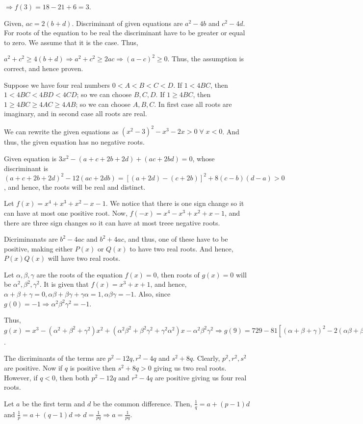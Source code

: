   $\Rightarrow f(3) = 18 - 21 + 6 = 3$.
\item Given, $ac = 2(b + d)$. Discriminant of given equations are $a^2 - 4b$ and $c^2 - 4d$. For roots of
  the equation to be real the discriminant have to be greater or equal to zero. We assume that it is the
  case. Thus,

  $a^2 + c^2\geq 4(b + d)\Rightarrow a^2 + c^2 \geq 2ac \Rightarrow (a - c)^2\geq 0$. Thus, the assumption
  is correct, and hence proven.
\item Suppose we have four real numbers $0 < A < B < C < D$. If $1 < 4BC$, then $1 < 4BC < 4BD < 4CD$; so we
  can choose $B, C, D$. If $1\geq 4BC$, then $1\geq 4BC\geq 4AC\geq 4AB$; so we can choose $A, B,C$. In
  first case all roots are imaginary, and in second case all roots are real.
\item We can rewrite the given equations as $(x^2 - 3)^2 - x^3 - 2x > 0\;\forall\;x < 0$. And thus, the
  given equation has no negative roots.
\item Given equation is $3x^2 - (a + c + 2b + 2d) + (ac + 2bd) = 0$, whose discriminant is $(a + c + 2b +
  2d)^2 - 12(ac + 2db) = [(a + 2d) - (c + 2b)]^2 + 8(c - b)(d - a) > 0$, and hence, the roots will be real
  and distinct.
\item Let $f(x) = x^4 + x^3 + x^2 - x - 1$. We notice that there is one sign change so it can have at most
  one positive root. Now, $f(-x) = x^4 - x^3 + x^2 + x - 1$, and there are three sign changes so it can have
  at most treee negative roots.
\item Dicriminanats are $b^2 - 4ac$ and $b^2 + 4ac$, and thus, one of these have to be positive, making
  either $P(x)$ or $Q(x)$ to have two real roots. And hence, $P(x)Q(x)$ will have two real roots.
\item Let $\alpha, \beta, \gamma$ are the roots of the equation $f(x) = 0$, then roots of $g(x) = 0$ will be
  $\alpha^2, \beta^2, \gamma^2$. It is given that $f(x) = x^3 + x + 1$, and hence, $\alpha + \beta + \gamma
  = 0, \alpha\beta + \beta\gamma + \gamma\alpha = 1, \alpha\beta\gamma = -1$. Also, since $g(0) =
  -1\Rightarrow \alpha^2\beta^2\gamma^2 = -1$.

  Thus, $g(x) = x^3 - (\alpha^2 + \beta^2 + \gamma^2)x^2 + (\alpha^2\beta^2 + \beta^2\gamma^2 +
  \gamma^2\alpha^2)x - \alpha^2\beta^2\gamma^2 \Rightarrow g(9) = 729 - 81[(\alpha + \beta + \gamma)^2 -
    2(\alpha\beta + \beta\gamma + \gamma\alpha)] + 9[(\alpha\beta + \beta\gamma + \gamma\alpha)^2 -
    \alpha\beta\gamma(\alpha + \beta + \gamma)] - \alpha^2\beta^2\gamma^2 = 729 + 162 + 9 - 1 = 899$.
\item The dicriminants of the terms are $p^2 - 12q, r^2 - 4q$ and $s^2 + 8q$. Clearly, $p^2, r^2, s^2$ are
  positive. Now if $q$ is positive then $s^2 + 8q  > 0$ giving us two real roots. However, if $q < 0$, then
  both $p^2 - 12q$ and $r^2 - 4q$ are positive giving us four real roots.
\item Let $a$ be the first term and $d$ be the common difference. Then, $\frac{1}{q} = a + (p - 1)d$ and
  $\frac{1}{p} = a + (q - 1)d\Rightarrow d = \frac{1}{pq} \Rightarrow a = \frac{1}{pq}$.

